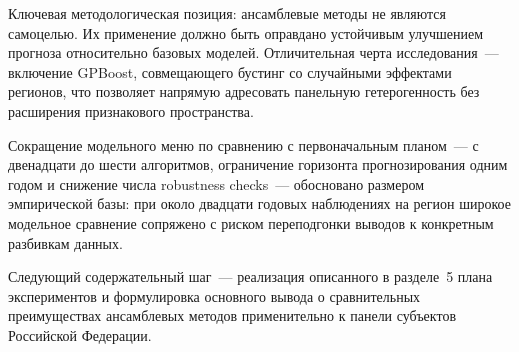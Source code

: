 \documentclass[12pt,a4paper]{article}
\begin{document}
Ключевая методологическая позиция: ансамблевые методы не являются
самоцелью. Их применение должно быть оправдано устойчивым улучшением
прогноза относительно базовых моделей. Отличительная черта исследования~---
включение GPBoost, совмещающего бустинг со случайными эффектами регионов,
что позволяет напрямую адресовать панельную гетерогенность без
расширения признакового пространства.

Сокращение модельного меню по сравнению с первоначальным планом~--- с
двенадцати до шести алгоритмов, ограничение горизонта прогнозирования
одним годом и снижение числа robustness checks~--- обосновано
размером эмпирической базы: при около двадцати годовых наблюдениях
на регион широкое модельное сравнение сопряжено с риском
переподгонки выводов к конкретным разбивкам данных.

Следующий содержательный шаг~--- реализация описанного в разделе~5
плана экспериментов и формулировка основного вывода о сравнительных
преимуществах ансамблевых методов применительно к панели субъектов
Российской Федерации.
\end{document}
